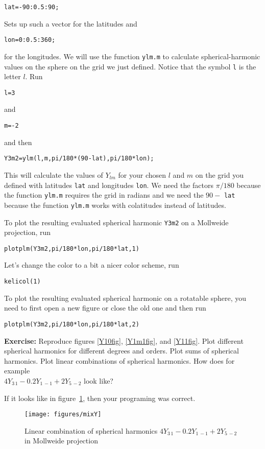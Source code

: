 \documentclass[11pt]{article}
\newcommand{\Yfun}{Y}
\begin{document}
\qquad \verb+lat=-90:0.5:90;+

Sets up such a vector for the latitudes and 

\qquad \verb+lon=0:0.5:360;+

for the longitudes. We will use the function \verb+ylm.m+ to
calculate spherical-harmonic values on the sphere on the grid we just
defined. Notice that the symbol \verb+l+ is the letter $l$. Run

\qquad \verb+l=3+ 

and 

\qquad \verb+m=-2+

and then 

\qquad \verb+Y3m2=ylm(l,m,pi/180*(90-lat),pi/180*lon);+

This will calculate the values of $\Yfun_{lm}$ for your chosen $l$ and
$m$ on the grid you defined with latitudes \verb+lat+ and longitudes
\verb+lon+. We need the factors $\pi/180$ because the function
\verb+ylm.m+ requires the grid in radians and we need the $90-$
\verb+lat+ because the function \verb+ylm.m+ works with colatitudes
instead of latitudes.

To plot the resulting evaluated spherical harmonic \verb+Y3m2+ on a
Mollweide projection, run
  
\qquad \verb+plotplm(Y3m2,pi/180*lon,pi/180*lat,1)+

Let's change the color to a bit a nicer color scheme, run

\quad \verb+kelicol(1)+


To plot the resulting evaluated spherical harmonic on a rotatable
sphere, you need to first open a new figure or close the old one and
then run

\qquad \verb+plotplm(Y3m2,pi/180*lon,pi/180*lat,2)+

\textbf{Exercise:} Reproduce figures \ref{Y10fig}, \ref{Y1m1fig}, and \ref{Y11fig}. Plot different spherical harmonics for different degrees and orders. Plot sums of spherical harmonics. Plot linear combinations of spherical harmonics. How does for example \\{$4\Yfun_{3\,1} - 0.2\Yfun_{1\,-1} +2\Yfun_{5\,-2}$} look like?

If it looks like in figure~\ref{MixY}, then your programing was
correct.

\begin{figure}[h]%
  \centering
  \texttt{[image: figures/mixY]}
  \caption{Linear combination of spherical harmonics $4\Yfun_{3\,1} - 0.2\Yfun_{1\,-1} +2\Yfun_{5\,-2}$ in Mollweide projection}
  \label{MixY}
\end{figure}
\end{document}
